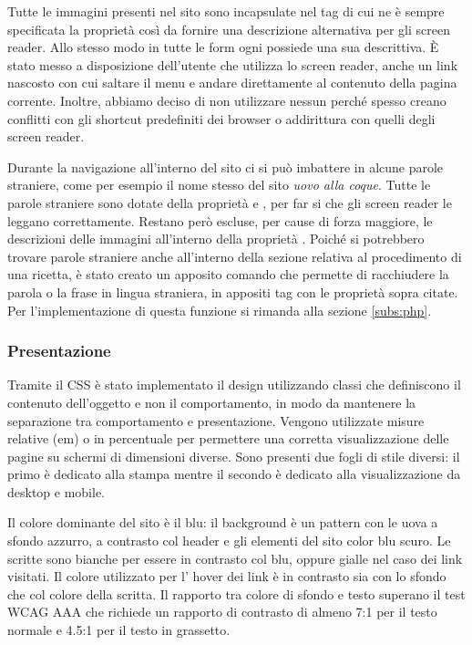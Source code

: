 Tutte le immagini presenti nel sito sono incapsulate nel tag  di cui ne è sempre specificata la proprietà  così da fornire una descrizione alternativa per gli screen reader. Allo stesso modo in tutte le form ogni  possiede una sua  descrittiva. È stato messo a disposizione dell'utente che utilizza lo screen reader, anche un link nascosto con cui saltare il menu e andare direttamente al contenuto della pagina corrente. Inoltre, abbiamo deciso di non utilizzare nessun  perché spesso creano conflitti con gli shortcut predefiniti dei browser o addirittura con quelli degli screen reader.

Durante la navigazione all'interno del sito ci si può imbattere in alcune parole straniere, come per esempio il nome stesso del sito \emph{uovo alla coque}. Tutte le parole straniere sono dotate della proprietà  e , per far si che gli screen reader le leggano correttamente. Restano però escluse, per cause di forza maggiore, le descrizioni delle immagini all'interno della proprietà . Poiché si potrebbero trovare parole straniere anche all'interno della sezione relativa al procedimento di una ricetta, è stato creato un apposito comando che permette di racchiudere la parola o la frase in lingua straniera, in appositi tag con le proprietà sopra citate. Per l'implementazione di questa funzione si rimanda alla sezione \ref{subs:php}.

\subsubsection{Presentazione}
Tramite il CSS è stato implementato il design utilizzando classi che definiscono il contenuto dell'oggetto e non il comportamento, in modo da mantenere la separazione tra comportamento e presentazione. Vengono utilizzate misure relative (em) o in percentuale per permettere una corretta visualizzazione delle pagine su schermi di dimensioni diverse. Sono presenti due fogli di stile diversi: il primo è dedicato alla stampa mentre il secondo è dedicato alla visualizzazione da desktop e mobile.

Il colore dominante del sito è il blu: il background è un pattern con le uova a sfondo azzurro, a contrasto col header e gli elementi del sito color blu scuro. Le scritte sono bianche per essere in contrasto col blu, oppure gialle nel caso dei link visitati. Il colore utilizzato per l' hover dei link è in contrasto sia con lo sfondo che col colore della scritta. Il rapporto tra colore di sfondo e testo superano il test WCAG AAA che richiede un rapporto di contrasto di almeno 7:1 per il testo normale e 4.5:1 per il testo in grassetto.

